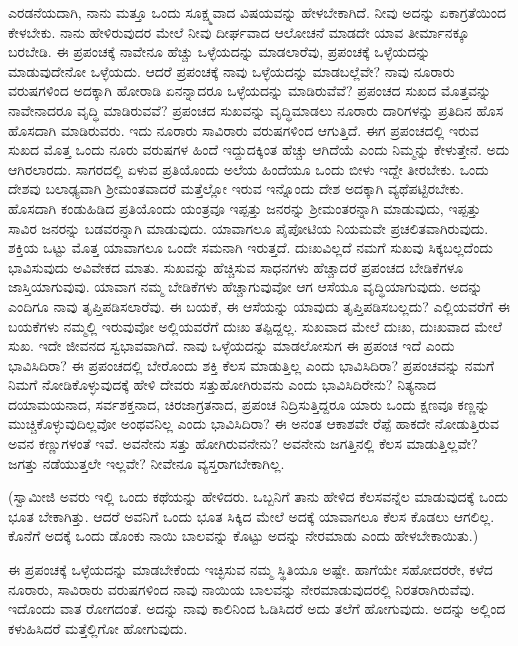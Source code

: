 ಎರಡನೆಯದಾಗಿ, ನಾನು ಮತ್ತೂ ಒಂದು ಸೂಕ್ಷ್ಮವಾದ ವಿಷಯವನ್ನು ಹೇಳಬೇಕಾಗಿದೆ. ನೀವು ಅದನ್ನು ಏಕಾಗ್ರತೆಯಿಂದ ಕೇಳಬೇಕು. ನಾನು ಹೇಳಿರುವುದರ ಮೇಲೆ ನೀವು ದೀರ್ಘವಾದ ಆಲೋಚನೆ ಮಾಡದೇ ಯಾವ ತೀರ್ಮಾನಕ್ಕೂ ಬರಬೇಡಿ. ಈ ಪ್ರಪಂಚಕ್ಕೆ ನಾವೇನೂ ಹೆಚ್ಚು ಒಳ್ಳೆಯದನ್ನು ಮಾಡಲಾರೆವು, ಪ್ರಪಂಚಕ್ಕೆ ಒಳ್ಳೆಯದನ್ನು ಮಾಡುವುದೇನೋ ಒಳ್ಳೆಯದು. ಆದರೆ ಪ್ರಪಂಚಕ್ಕೆ ನಾವು ಒಳ್ಳೆಯದನ್ನು ಮಾಡಬಲ್ಲೆವೇ? ನಾವು ನೂರಾರು ವರುಷಗಳಿಂದ ಅದಕ್ಕಾಗಿ ಹೋರಾಡಿ ಏನನ್ನಾದರೂ ಒಳ್ಳೆಯದನ್ನು ಮಾಡಿರುವೆವೆ? ಪ್ರಪಂಚದ ಸುಖದ ಮೊತ್ತವನ್ನು ನಾವೇನಾದರೂ ವೃದ್ಧಿ ಮಾಡಿರುವವೆ? ಪ್ರಪಂಚದ ಸುಖವನ್ನು ವೃದ್ಧಿಮಾಡಲು ನೂರಾರು ದಾರಿಗಳನ್ನು ಪ್ರತಿದಿನ ಹೊಸ ಹೊಸದಾಗಿ ಮಾಡಿರುವರು. ಇದು ನೂರಾರು ಸಾವಿರಾರು ವರುಷಗಳಿಂದ ಆಗುತ್ತಿದೆ. ಈಗ ಪ್ರಪಂಚದಲ್ಲಿ ಇರುವ ಸುಖದ ಮೊತ್ತ ಒಂದು ನೂರು ವರುಷಗಳ ಹಿಂದೆ ಇದ್ದುದಕ್ಕಿಂತ ಹೆಚ್ಚು ಆಗಿದೆಯೆ ಎಂದು ನಿಮ್ಮನ್ನು ಕೇಳುತ್ತೇನೆ. ಅದು ಆಗಿರಲಾರದು. ಸಾಗರದಲ್ಲಿ ಏಳುವ ಪ್ರತಿಯೊಂದು ಅಲೆಯ ಹಿಂದೆಯೂ ಒಂದು ಬೀಳು ಇದ್ದೇ ತೀರಬೇಕು. ಒಂದು ದೇಶವು ಬಲಾಢ್ಯವಾಗಿ ಶ‍್ರೀಮಂತವಾದರೆ ಮತ್ತೆಲ್ಲೋ ಇರುವ ಇನ್ನೊಂದು ದೇಶ ಅದಕ್ಕಾಗಿ ವ್ಯಥೆಪಟ್ಟಿರಬೇಕು. ಹೊಸದಾಗಿ ಕಂಡುಹಿಡಿದ ಪ್ರತಿಯೊಂದು ಯಂತ್ರವೂ ಇಪ್ಪತ್ತು ಜನರನ್ನು ಶ‍್ರೀಮಂತರನ್ನಾಗಿ ಮಾಡುವುದು, ಇಪ್ಪತ್ತು ಸಾವಿರ ಜನರನ್ನು ಬಡವರನ್ನಾಗಿ ಮಾಡುವುದು. ಯಾವಾಗಲೂ ಪೈಪೋಟಿಯ ನಿಯಮವೇ ಪ್ರಚಲಿತವಾಗಿರುವುದು. ಶಕ್ತಿಯ ಒಟ್ಟು ಮೊತ್ತ ಯಾವಾಗಲೂ ಒಂದೇ ಸಮನಾಗಿ ಇರುತ್ತದೆ. ದುಃಖವಿಲ್ಲದೆ ನಮಗೆ ಸುಖವು ಸಿಕ್ಕಬಲ್ಲದೆಂದು ಭಾವಿಸುವುದು ಅವಿವೇಕದ ಮಾತು. ಸುಖವನ್ನು ಹೆಚ್ಚಿಸುವ ಸಾಧನಗಳು ಹೆಚ್ಚಾದರೆ ಪ್ರಪಂಚದ ಬೇಡಿಕೆಗಳೂ ಜಾಸ್ತಿಯಾಗುವುವು. ಯಾವಾಗ ನಮ್ಮ ಬೇಡಿಕೆಗಳು ಹೆಚ್ಚಾಗುವುವೋ ಆಗ ಆಸೆಯೂ ವೃದ್ಧಿಯಾಗುವುದು. ಅದನ್ನು ಎಂದಿಗೂ ನಾವು ತೃಪ್ತಿಪಡಿಸಲಾರೆವು. ಈ ಬಯಕೆ, ಈ ಆಸೆಯನ್ನು ಯಾವುದು ತೃಪ್ತಿಪಡಿಸಬಲ್ಲದು? ಎಲ್ಲಿಯವರೆಗೆ ಈ ಬಯಕೆಗಳು ನಮ್ಮಲ್ಲಿ ಇರುವುವೋ ಅಲ್ಲಿಯವರೆಗೆ ದುಃಖ ತಪ್ಪಿದ್ದಲ್ಲ. ಸುಖವಾದ ಮೇಲೆ ದುಃಖ, ದುಃಖವಾದ ಮೇಲೆ ಸುಖ. ಇದೇ ಜೀವನದ ಸ್ವಭಾವವಾಗಿದೆ. ನಾವು ಒಳ್ಳೆಯದನ್ನು ಮಾಡಲೋಸುಗ ಈ ಪ್ರಪಂಚ ಇದೆ ಎಂದು ಭಾವಿಸಿದಿರಾ? ಈ ಪ್ರಪಂಚದಲ್ಲಿ ಬೇರೊಂದು ಶಕ್ತಿ ಕೆಲಸ ಮಾಡುತ್ತಿಲ್ಲ ಎಂದು ಭಾವಿಸಿದಿರಾ? ಪ್ರಪಂಚವನ್ನು ನಮಗೆ ನಿಮಗೆ ನೋಡಿಕೊಳ್ಳುವುದಕ್ಕೆ ಹೇಳಿ ದೇವರು ಸತ್ತುಹೋಗಿರುವನು ಎಂದು ಭಾವಿಸಿದಿರೇನು? ನಿತ್ಯನಾದ ದಯಾಮಯನಾದ, ಸರ್ವಶಕ್ತನಾದ, ಚಿರಜಾಗ್ರತನಾದ, ಪ್ರಪಂಚ ನಿದ್ರಿಸುತ್ತಿದ್ದರೂ ಯಾರು ಒಂದು ಕ್ಷಣವೂ ಕಣ್ಣನ್ನು ಮುಚ್ಚಿಕೊಳ್ಳುವುದಿಲ್ಲವೋ ಅಂಥವನಿಲ್ಲ ಎಂದು ಭಾವಿಸಿದಿರಾ? ಈ ಅನಂತ ಆಕಾಶವೇ ರೆಪ್ಪೆ ಹಾಕದೇ ನೋಡುತ್ತಿರುವ ಅವನ ಕಣ್ಣುಗಳಂತೆ ಇವೆ. ಅವನೇನು ಸತ್ತು ಹೋಗಿರುವನೇನು? ಅವನೇನು ಜಗತ್ತಿನಲ್ಲಿ ಕೆಲಸ ಮಾಡುತ್ತಿಲ್ಲವೇ? ಜಗತ್ತು ನಡೆಯುತ್ತಲೇ ಇಲ್ಲವೇ? ನೀವೇನೂ ವ್ಯಸ್ತರಾಗಬೇಕಾಗಿಲ್ಲ.

(ಸ್ವಾಮೀಜಿ ಅವರು ಇಲ್ಲಿ ಒಂದು ಕಥೆಯನ್ನು ಹೇಳಿದರು. ಒಬ್ಬನಿಗೆ ತಾನು ಹೇಳಿದ ಕೆಲಸವನ್ನೆಲ ಮಾಡುವುದಕ್ಕೆ ಒಂದು ಭೂತ ಬೇಕಾಗಿತ್ತು. ಆದರೆ ಅವನಿಗೆ ಒಂದು ಭೂತ ಸಿಕ್ಕಿದ ಮೇಲೆ ಅದಕ್ಕೆ ಯಾವಾಗಲೂ ಕೆಲಸ ಕೊಡಲು ಆಗಲಿಲ್ಲ. ಕೊನೆಗೆ ಅದಕ್ಕೆ ಒಂದು ಡೊಂಕು ನಾಯಿ ಬಾಲವನ್ನು ಕೊಟ್ಟು ಅದನ್ನು ನೇರಮಾಡು ಎಂದು ಹೇಳಬೇಕಾಯಿತು.)

ಈ ಪ್ರಪಂಚಕ್ಕೆ ಒಳ್ಳೆಯದನ್ನು ಮಾಡಬೇಕೆಂದು ಇಚ್ಛಿಸುವ ನಮ್ಮ ಸ್ಥಿತಿಯೂ ಅಷ್ಟೇ. ಹಾಗೆಯೇ ಸಹೋದರರೇ, ಕಳೆದ ನೂರಾರು, ಸಾವಿರಾರು ವರುಷಗಳಿಂದ ನಾವು ನಾಯಿಯ ಬಾಲವನ್ನು ನೇರಮಾಡುವುದರಲ್ಲಿ ನಿರತರಾಗಿರುವೆವು. ಇದೊಂದು ವಾತ ರೋಗದಂತೆ. ಅದನ್ನು ನಾವು ಕಾಲಿನಿಂದ ಓಡಿಸಿದರೆ ಅದು ತಲೆಗೆ ಹೋಗುವುದು. ಅದನ್ನು ಅಲ್ಲಿಂದ ಕಳುಹಿಸಿದರೆ ಮತ್ತೆಲ್ಲಿಗೋ ಹೋಗುವುದು.

